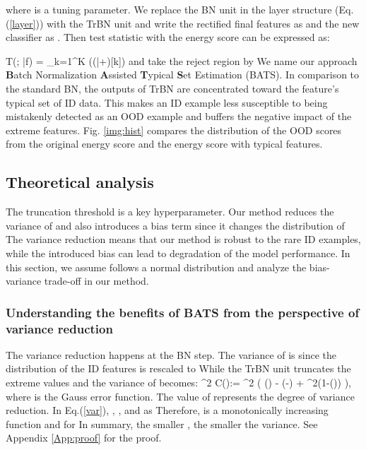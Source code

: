 \documentclass{article}
\newcommand{\benr}{}
\def\rvx{{\mathbf{x}}}
\begin{document}
where  is a tuning parameter.
We replace the BN unit in the layer structure (Eq.(\ref{layer})) with the TrBN unit and write the rectified final features as  and the new classifier as . 
Then test statistic with the energy score can be expressed as:
\benr
T(\rvx; \bar f) = \log \sum_{k=1}^{K} \exp({(\cdot \bar{}+)}[k])
\eenr
and take the reject region by  
We name our approach \textbf{B}atch Normalization \textbf{A}ssisted \textbf{T}ypical \textbf{S}et Estimation (BATS). In comparison to the standard BN, the outputs of TrBN are concentrated toward the feature's typical set of ID data. This makes an ID example less susceptible to being mistakenly detected as an OOD example and buffers the negative impact of the extreme features. Fig. \ref{img:hist} compares the distribution of the OOD scores from the original energy score and the energy score with typical features.



\subsection{Theoretical analysis} \label{sec43}


The truncation threshold  is a key hyperparameter. 
Our method reduces the variance of  and also introduces a bias term since it changes the distribution of  
The variance reduction means that our method is robust to the rare ID examples, while the introduced bias can lead to degradation of the model performance.
In this section, we assume  follows a normal distribution and analyze the bias-variance trade-off in our method. 





\subsubsection{Understanding the benefits of BATS from the perspective of variance reduction}
The variance reduction happens at the BN step. The variance of  is  since the distribution of the ID features  is rescaled to 
While the TrBN unit truncates the extreme values and the variance of  becomes:
\benr\label{var}
\sigma^2 C(\lambda):= \sigma^2 \Big( () - \lambda \exp(-) + \lambda^2(1-()) \Big),
\eenr
where  is the Gauss error function.
The value of  represents the degree of variance reduction.
In Eq.(\ref{var}), , , and  as  Therefore,  is a monotonically increasing function and  for  In summary, the smaller , the smaller the variance. See Appendix \ref{App:proof} for the proof.
\end{document}

